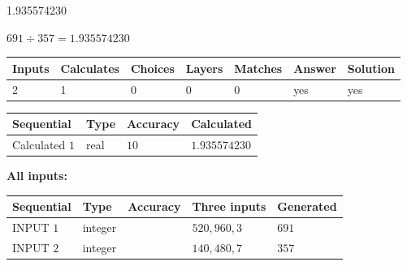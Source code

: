 \documentclass{ctexart}
\begin{document}
 
 
\noindent{}
 
 

1.935574230
 
 
\noindent{}
 
 

 
 
 
\noindent{}
 
 

$ %
691 \div  %
357=   %
1.935574230$
 
 
\noindent{}
 
 

 
   
   
   
   
\noindent\begin{tabular}{|l|l|l|l|l|l|l|}
 \hline
Inputs & Calculates & Choices & Layers & Matches & Answer & Solution \\ \hline
 2  & 
 1  & 
 0
  & 
 0  & 
 0  & 
  yes & 
  yes 
  \\ \hline
 \end{tabular}
   
   
   
   
\noindent{}
   
   
  
  
\noindent\begin{tabular}{|l|l|l|l|}
\hline
 Sequential & Type & Accuracy & Calculated \\ 
\hline
 
 
  Calculated $  1 $ & real & $  10  $ & 
 $ 1.935574230 $ 
 \\  \hline  
 \end{tabular}
   
   
   
   
\noindent\vspace{0.1in}\hspace{-0.08in} {\textbf{\Large{All inputs: }}}
   
   
  
  
\noindent\begin{tabular}{|l|l|l|l|l|}
\hline
 Sequential & Type & Accuracy & Three inputs & Generated \\ 
\hline
 
 
  INPUT $  1 $ & integer &  & $
 520
 , 
 960
 , 
 3
 $ & $ 691 $ 
 \\  \hline  
 
 
  INPUT $  2 $ & integer &  & $
 140
 , 
 480
 , 
 7
 $ & $ 357 $ 
 \\  \hline  
 \end{tabular}
   
\end{document}
